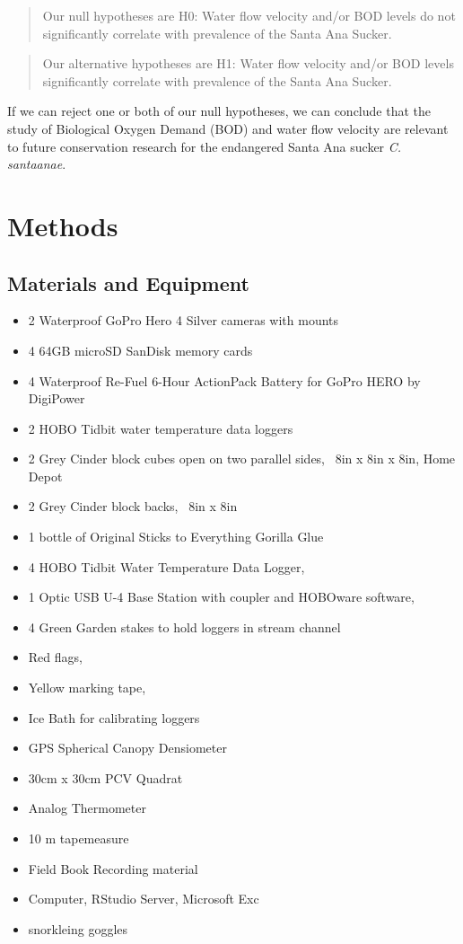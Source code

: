 \documentclass{article}\usepackage[]{graphicx}\usepackage[]{color}
\begin{document}
\begin{quote}
Our null hypotheses are H0: Water flow velocity and/or BOD levels do not significantly correlate with prevalence of the Santa Ana Sucker.
\end{quote}
\begin{quote}
Our alternative hypotheses are H1: Water flow velocity and/or BOD levels significantly correlate with prevalence of the Santa Ana Sucker.
\end{quote}
If we can reject one or both of our null hypotheses, we can conclude that the study of Biological Oxygen Demand (BOD) and water flow velocity are relevant to future conservation research for the endangered Santa Ana sucker \emph{C. santaanae}.


\section{Methods}

\subsection{Materials and Equipment}
\begin{itemize}
\item 2 Waterproof GoPro Hero 4 Silver cameras with mounts
\item 4 64GB microSD SanDisk memory cards
\item 4 Waterproof Re-Fuel 6-Hour ActionPack Battery for GoPro HERO by DigiPower
\item 2 HOBO Tidbit water temperature data loggers
\item 2 Grey Cinder block cubes open on two parallel sides, ~8in x 8in x 8in, Home Depot
\item 2 Grey Cinder block backs, ~8in x 8in
\item 1 bottle of Original Sticks to Everything Gorilla Glue
\item 4 HOBO Tidbit Water Temperature Data Logger,
\item 1 Optic USB U-4 Base Station with coupler and HOBOware software,
\item 4 Green Garden stakes to hold loggers in stream channel
\item Red flags,
\item Yellow marking tape,
\item Ice Bath for calibrating loggers
\item GPS Spherical Canopy Densiometer
\item 30cm x 30cm PCV Quadrat
\item Analog Thermometer
\item 10 m tapemeasure
\item Field Book Recording material
\item Computer, RStudio Server, Microsoft Exc
\item snorkleing goggles 

\end{itemize}
\end{document}
